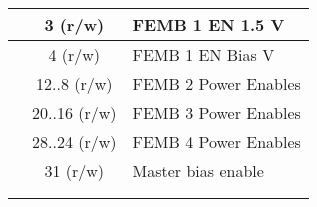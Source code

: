 \documentclass[landscape,margin=3pt,pstricks]{standalone}
\begin{document}
\begin{tabular}{|c|c|*{32}{c|}}
 & 3 (r/w) &  \multicolumn{32}{|l|}{FEMB 1 EN 1.5 V} \\ \hline
 & 4 (r/w) &  \multicolumn{32}{|l|}{FEMB 1 EN Bias V} \\ \hline
 & 12..8 (r/w) &  \multicolumn{32}{|l|}{FEMB 2 Power Enables} \\ \hline
 & 20..16 (r/w) &  \multicolumn{32}{|l|}{FEMB 3 Power Enables} \\ \hline
 & 28..24 (r/w) &  \multicolumn{32}{|l|}{FEMB 4 Power Enables} \\ \hline
 & 31 (r/w) &  \multicolumn{32}{|l|}{Master bias enable} \\ \hline
 &  &  \multicolumn{32}{|l|}{} \\ \hline
 &  &  \multicolumn{32}{|l|}{} \\ \hline
  \hline
\end{tabular}
\end{document}
